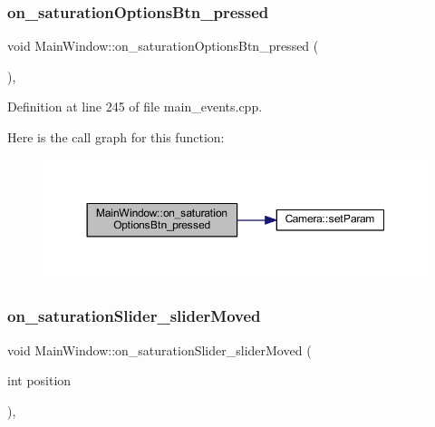 \subsubsection{\texorpdfstring{on\_saturationOptionsBtn\_pressed}{on\_saturationOptionsBtn\_pressed}}
{\footnotesize\ttfamily void Main\+Window\+::on\+\_\+saturation\+Options\+Btn\+\_\+pressed (\begin{DoxyParamCaption}{ }\end{DoxyParamCaption})\hspace{0.3cm}{\ttfamily [private]}, {\ttfamily [slot]}}



Definition at line 245 of file main\+\_\+events.\+cpp.

Here is the call graph for this function\+:
\nopagebreak
\begin{figure}[H]
\begin{center}
\leavevmode
\includegraphics[width=350pt]{classMainWindow_aa663ee1d7e10715e4998923eb87e5d15_cgraph}
\end{center}
\end{figure}
\mbox{\label{classMainWindow_abd0b71ebb4667aa574bfa870ade22f58}} 
\subsubsection{\texorpdfstring{on\_saturationSlider\_sliderMoved}{on\_saturationSlider\_sliderMoved}}
{\footnotesize\ttfamily void Main\+Window\+::on\+\_\+saturation\+Slider\+\_\+slider\+Moved (\begin{DoxyParamCaption}\item[{int}]{position }\end{DoxyParamCaption})\hspace{0.3cm}{\ttfamily [private]}, {\ttfamily [slot]}}



